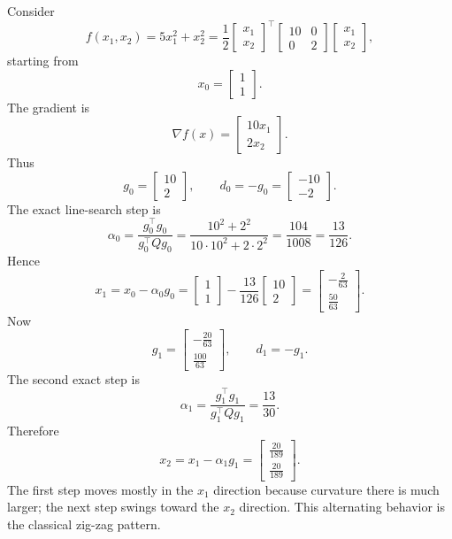 \begin{eg}
	Consider
	\[
		f(x_1,x_2)=5x_1^2+x_2^2
		=\frac{1}{2}
		\begin{bmatrix}x_1 \\ x_2\end{bmatrix}^\top
		\begin{bmatrix}
			10 & 0 \\
			0  & 2
		\end{bmatrix}
		\begin{bmatrix}x_1 \\ x_2\end{bmatrix},
	\]
	starting from
	\[
		x_0=\begin{bmatrix}1 \\ 1\end{bmatrix}.
	\]
	The gradient is
	\[
		\nabla f(x)=
		\begin{bmatrix}
			10x_1 \\
			2x_2
		\end{bmatrix}.
	\]
	Thus
	\[
		g_0=\begin{bmatrix}10 \\ 2\end{bmatrix},
		\qquad
		d_0=-g_0=\begin{bmatrix}-10 \\ -2\end{bmatrix}.
	\]
	The exact line-search step is
	\[
		\alpha_0
		=
		\frac{g_0^\top g_0}{g_0^\top Qg_0}
		=
		\frac{10^2+2^2}{10\cdot 10^2 + 2\cdot 2^2}
		=
		\frac{104}{1008}
		=
		\frac{13}{126}.
	\]
	Hence
	\[
		x_1=x_0-\alpha_0 g_0
		=
		\begin{bmatrix}
			1 \\
			1
		\end{bmatrix}
		-
		\frac{13}{126}
		\begin{bmatrix}
			10 \\
			2
		\end{bmatrix}
		=
		\begin{bmatrix}
			-\frac{2}{63} \\
			\frac{50}{63}
		\end{bmatrix}.
	\]
	Now
	\[
		g_1=
		\begin{bmatrix}
			-\frac{20}{63} \\
			\frac{100}{63}
		\end{bmatrix},
		\qquad
		d_1=-g_1.
	\]
	The second exact step is
	\[
		\alpha_1
		=
		\frac{g_1^\top g_1}{g_1^\top Q g_1}
		=
		\frac{13}{30}.
	\]
	Therefore
	\[
		x_2=x_1-\alpha_1 g_1
		=
		\begin{bmatrix}
			\frac{20}{189} \\
			\frac{20}{189}
		\end{bmatrix}.
	\]
	The first step moves mostly in the $x_1$ direction because curvature there is much larger; the next step swings toward the $x_2$ direction. This alternating behavior is the classical zig-zag pattern.
\end{eg}

